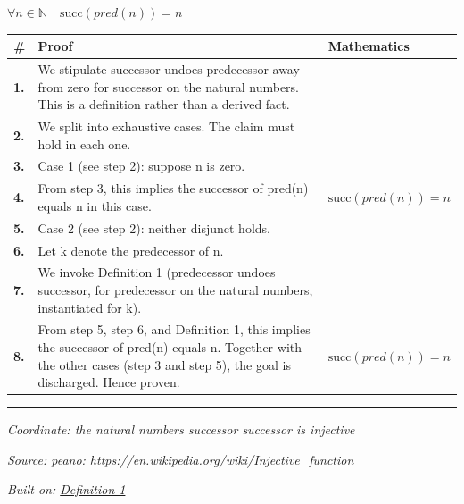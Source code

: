\documentclass[11pt]{article}
\theoremstyle{definition}
\begin{document}
\noindent$\displaystyle \forall n \in \mathbb{N}\quad \mathrm{succ}(pred(n)) = n$\par
\medskip
\noindent
\begin{tabular}{@{} >{\raggedright\arraybackslash}p{} >{\raggedright\arraybackslash}p{} >{\raggedleft\arraybackslash}p{} @{}}
\textbf{\#} & \textbf{Proof} & \textbf{Mathematics} \\
\midrule
\textbf{1.} & We stipulate successor undoes predecessor away from zero for successor on the natural numbers. This is a definition rather than a derived fact. & \\[0.45em]
\textbf{2.} & We split into exhaustive cases. The claim must hold in each one. & \\[0.45em]
\textbf{3.} & Case 1 (see step 2): suppose n is zero. & \\[0.45em]
\textbf{4.} & From step 3, this implies the successor of pred(n) equals n in this case. & $\displaystyle \mathrm{succ}(pred(n)) = n$ \\[0.45em]
\textbf{5.} & Case 2 (see step 2): neither disjunct holds. & \\[0.45em]
\textbf{6.} & Let k denote the predecessor of n. & \\[0.45em]
\textbf{7.} & We invoke Definition 1 (predecessor undoes successor, for predecessor on the natural numbers, instantiated for k). & \\[0.45em]
\textbf{8.} & From step 5, step 6, and Definition 1, this implies the successor of pred(n) equals n. Together with the other cases (step 3 and step 5), the goal is discharged. Hence proven. & $\displaystyle \mathrm{succ}(pred(n)) = n$ \\[0.45em]
\bottomrule
\end{tabular}
\label{thm:Nat-successor-successor_undoes_predecessor_away_from_zero}
\par\medskip\hrule
\bigskip
{}\par
\smallskip\noindent\textit{Coordinate: the natural numbers \cdot successor \cdot successor is injective}\par
\smallskip\noindent\textit{Source: peano: https://en.wikipedia.org/wiki/Injective\_function}\par
\smallskip\noindent\textit{Built on: \hyperref[thm:Nat-predecessor-predecessor_undoes_successor]{Definition 1}}\par
\end{document}
